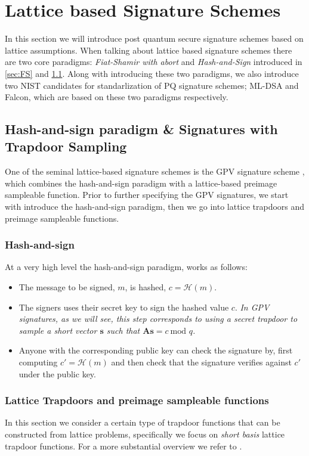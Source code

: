 \section{Lattice based Signature Schemes}\label{sec:sig}
In this section we will introduce post quantum secure signature schemes based on lattice assumptions. 
When talking about lattice based signature schemes there are two core paradigms: \textit{Fiat-Shamir with abort} and \textit{Hash-and-Sign} introduced in \ref{sec:FS} and \ref{sec:hash-n-sign}. Along with introducing these two paradigms, we also introduce two NIST candidates for standarlization of PQ signature schemes; ML-DSA and Falcon, which  are based on these two paradigms respectively.

\subsection{Hash-and-sign paradigm \& Signatures with Trapdoor Sampling} \label{sec:hash-n-sign}
One of the seminal lattice-based signature schemes is the GPV  signature scheme \cite{STOC:GenPeiVai08}, which combines the hash-and-sign paradigm with a lattice-based preimage sampleable function.
Prior to further specifying the GPV signatures, we start with introduce the hash-and-sign paradigm, then we go into lattice trapdoors and preimage sampleable functions.
\subsubsection{Hash-and-sign}
At a very high level the hash-and-sign paradigm, works as follows:
\begin{itemize}
    \item The message to be signed, $m$, is hashed, $c=\mathcal{H}(m)$.
    \item The signers uses their secret key to sign the hashed value $c$. \textit{In GPV signatures, as we will see, this step corresponds to using a secret trapdoor to sample a short vector \(\mathbf{s}\) such that \(\mathbf{As}= c \: \text{mod } q\).}
    \item Anyone with the corresponding public key can check the signature by, first computing $c'=\mathcal{H}(m)$ and then check that the signature verifies against $c'$ under the public key.
\end{itemize}

\subsubsection{Lattice Trapdoors and preimage sampleable functions}
In this section we consider a certain type of trapdoor functions that can be constructed from lattice problems, specifically we focus on \textit{short basis} lattice trapdoor functions. For a more substantial overview we refer to \cite{STOC:GenPeiVai08,peikert_dec}.

